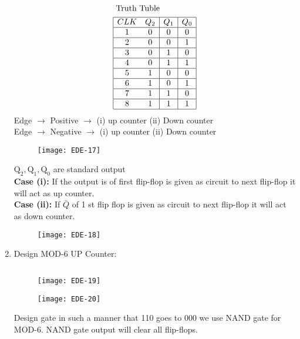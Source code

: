 \begin{enumerate}
\begin{figure}[H]
 \end{figure}
\begin{align*}
	&\text { Truth Tuble }\\
	&\begin{array}{|cc|c|c|}
		\hline C L K & Q_{2} & Q_{1} & Q_{0} \\
		\hline 1 & 0 & 0 & 0 \\
		\hline 2 & 0 & 0 & 1 \\
		\hline 3 & 0 & 1 & 0 \\
		\hline 4 & 0 & 1 & 1 \\
		\hline 5 & 1 & 0 & 0 \\
		\hline 6 & 1 & 0 & 1 \\
		\hline 7 & 1 & 1 & 0 \\
		\hline 8 & 1 & 1 & 1 \\
		\hline
	\end{array}
\end{align*}
 	Edge $\rightarrow$ Positive $\rightarrow$ (i) up counter (ii) Down counter \\
 	Edge $\rightarrow$ Negative $\rightarrow$ (i) up counter (ii) Down counter
 	\begin{figure}[H]
 		\centering
 		\texttt{[image: EDE-17]}
 	\end{figure}
 	$\mathrm{Q}_{2}, \mathrm{Q}_{1}, \mathrm{Q}_{0}$ are standard output\\
 	\textbf{Case (i):} If the output is of first flip-flop is given as circuit to next flip-flop it will act as up counter.\\
 	\textbf{Case (ii):} If $\bar{Q}$ of 1 st flip flop is given as circuit to next flip-flop it will act as down counter.
 	\begin{figure}[H]
 	\centering
 	\texttt{[image: 	EDE-18]}
 \end{figure}
 	\item Design MOD-6 UP Counter:
 	\begin{answer}	$\left. \right. $\\
 		\begin{figure}[H]
 			\centering
 			\texttt{[image: EDE-19]}
 		\end{figure}
 		\begin{figure}[H]
 		\centering
 		\texttt{[image: EDE-20]}
 	\end{figure}
 		Design gate in such a manner that 110 goes to 000 we use NAND gate for MOD-6. NAND gate output will clear all flip-flops.\\

\end{answer}
\end{enumerate}
